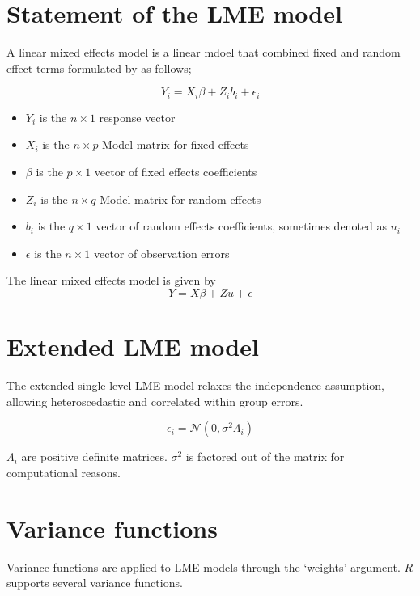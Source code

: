 \documentclass[12pt, a4paper]{report}
\theoremstyle{plain}
\theoremstyle{definition}
\theoremstyle{remark}
\begin{document}
\section{Statement of the LME model}
A linear mixed effects model is a linear mdoel that combined fixed and random effect terms formulated by \citet{LW82} as follows;

\begin{displaymath}
Y_{i} =X_{i}\beta + Z_{i}b_{i} + \epsilon_{i}
\end{displaymath}
\begin{itemize}
	
	\item $Y_{i}$ is the $n \times 1$ response vector \item $X_{i}$ is
	the $n \times p$ Model matrix for fixed effects \item $\beta$ is
	the $p \times 1$ vector of fixed effects coefficients \item
	$Z_{i}$ is the $n \times q$ Model matrix for random effects \item
	$b_{i}$ is the $q \times 1$ vector of random effects coefficients,
	sometimes denoted as $u_{i}$ \item $\epsilon$ is the $n \times 1$
	vector of observation errors
\end{itemize}


The linear mixed effects model is given by
\begin{equation}
Y = X\beta + Zu + \epsilon
\end{equation}
\section{Extended LME model}
The extended single level LME model relaxes the independence assumption, allowing heteroscedastic and correlated within group errors.


\begin{equation}
\epsilon_{i} = \mathcal{N}(0, \sigma^2 \Lambda_{i})
\end{equation}

$\Lambda_{i}$ are positive definite matrices. $\sigma^2$ is factored out of the matrix for computational reasons.


\section{Variance functions}

Variance functions are applied to LME models through the `weights' argument. $R$ supports several variance functions.
\end{document}
